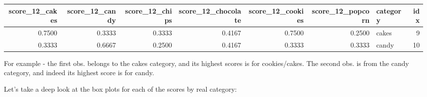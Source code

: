 \documentclass[
]{article}
\begin{document}
\begin{table}[H]
\centering\begingroup\fontsize{8}{10}\selectfont

\begin{tabular}{rrrrrrlr}
\toprule
score\_12\_cakes & score\_12\_candy & score\_12\_chips & score\_12\_chocolate & score\_12\_cookies & score\_12\_popcorn & category & idx\\
\midrule
\rowcolor{gray!6}  0.7500 & 0.3333 & 0.3333 & 0.4167 & 0.7500 & 0.2500 & cakes & 9\\
0.3333 & 0.6667 & 0.2500 & 0.4167 & 0.3333 & 0.3333 & candy & 10\\
\bottomrule
\end{tabular}
\endgroup{}
\end{table}

For example - the first obs. belongs to the cakes category, and its
highest scores is for cookies/cakes. The second obs. is from the candy
category, and indeed its highest score is for candy.

Let's take a deep look at the box plots for each of the scores by real
category:
\end{document}
